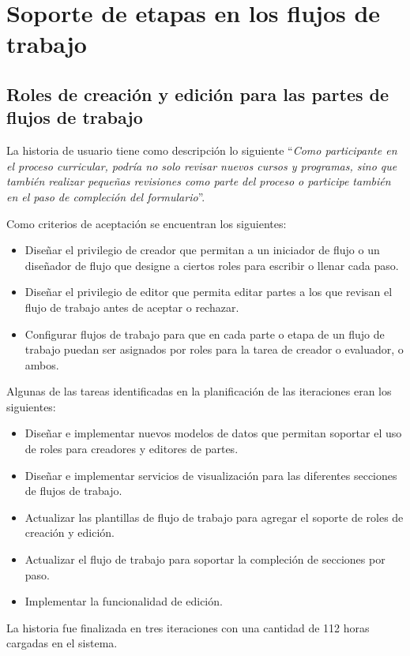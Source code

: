 \section{Soporte de etapas en los flujos de trabajo}
\subsection{Roles de creación y edición para las partes de flujos de trabajo}
La historia de usuario tiene como descripción lo siguiente \enquote{\textit{Como participante en el proceso curricular, podría no solo revisar nuevos cursos y programas, sino que también realizar pequeñas revisiones como parte del proceso o participe también en el paso de compleción del formulario}}.

Como criterios de aceptación se encuentran los siguientes:
\begin{itemize}
	\item Diseñar el privilegio de creador que permitan a un iniciador de flujo o un diseñador de flujo que designe a ciertos roles para escribir o llenar cada paso.
	\item Diseñar el privilegio de editor que permita editar partes a los que revisan el flujo de trabajo antes de aceptar o rechazar.
	\item Configurar flujos de trabajo para que en cada parte o etapa de un flujo de trabajo puedan ser asignados por roles para la tarea de creador o evaluador, o ambos.
\end{itemize}

Algunas de las tareas identificadas en la planificación de las iteraciones eran los siguientes:
\begin{itemize}
	\item Diseñar e implementar nuevos modelos de datos que permitan soportar el uso de roles para creadores y editores de partes.
	\item Diseñar e implementar servicios de visualización para las diferentes secciones de flujos de trabajo.
	\item Actualizar las plantillas de flujo de trabajo para agregar el soporte de roles de creación y edición.
	\item Actualizar el flujo de trabajo para soportar la compleción de secciones por paso.
	\item Implementar la funcionalidad de edición.
\end{itemize}

La historia fue finalizada en tres iteraciones con una cantidad de 112 horas cargadas en el sistema.


